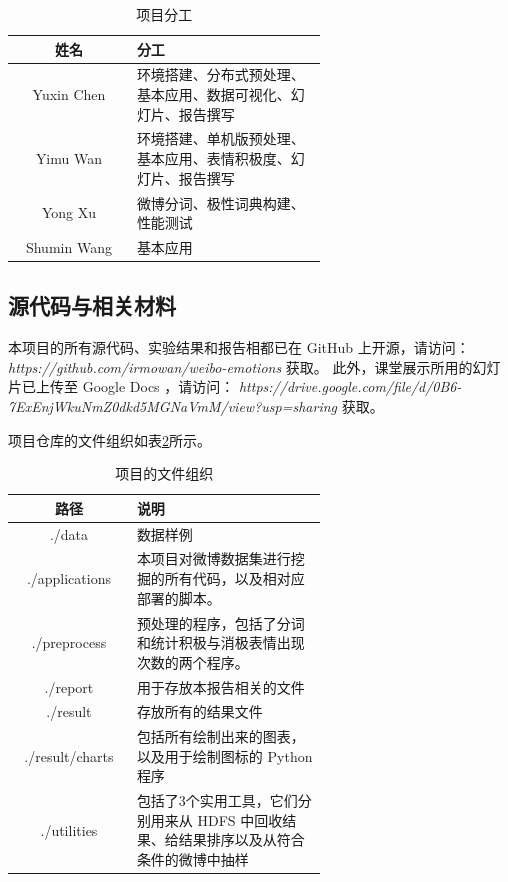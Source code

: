 \documentclass[12pt, oneside]{article}
\begin{document}
\begin{spacing}{1.5}
\begin{CJK}{UTF8}{gbsn}
\begin{table}[]
\centering
\begin{tabular}{|c|p{0.618\linewidth}|}
\hline
姓名          & 分工                              \\ \hline
Yuxin Chen  & 环境搭建、分布式预处理、基本应用、数据可视化、幻灯片、报告撰写 \\ \hline
Yimu Wan    & 环境搭建、单机版预处理、基本应用、表情积极度、幻灯片、报告撰写     \\ \hline
Yong Xu     & 微博分词、极性词典构建、性能测试                     \\ \hline
Shumin Wang & 基本应用                            \\ \hline
\end{tabular}
\caption{项目分工}
\label{tbl:responsibilities}
\end{table}

\subsection{源代码与相关材料}
本项目的所有源代码、实验结果和报告相都已在 GitHub 上开源，请访问： {\it https://github.com/irmowan/weibo-emotions} 获取。
此外，课堂展示所用的幻灯片已上传至 Google Docs ，请访问： {\it https://drive.google.com/file/d/0B6-7ExEnjWkuNmZ0dkd5MGNaVmM/view?usp=sharing} 获取。

项目仓库的文件组织如表\ref{tbl:files_organization}所示。
\begin{table}[]
\centering
\begin{tabular}{|c|p{0.618\linewidth}|}
\hline
路径              & 说明                               \\ \hline
./data	   &  数据样例			\\ \hline
./applications  & 本项目对微博数据集进行挖掘的所有代码，以及相对应部署的脚本。    \\ \hline
./preprocess    & 预处理的程序，包括了分词和统计积极与消极表情出现次数的两个程序。 \\ \hline
./report        & 用于存放本报告相关的文件                     \\ \hline
./result        & 存放所有的结果文件                        \\ \hline
./result/charts & 包括所有绘制出来的图表，以及用于绘制图标的 Python 程序    \\ \hline
./utilities     & 包括了3个实用工具，它们分别用来从 HDFS 中回收结果、给结果排序以及从符合条件的微博中抽样        \\ \hline
\end{tabular}
\caption{项目的文件组织}
\label{tbl:files_organization}
\end{table}


\end{CJK}
\end{spacing}
\end{document}
